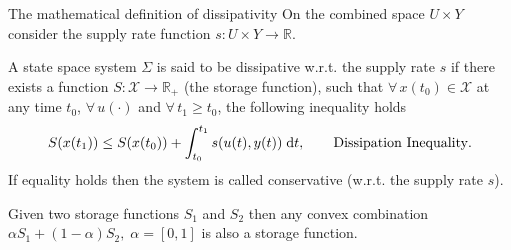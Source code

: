 \documentclass[aspectratio=169]{beamer}
\newcommand{\bbR}{\mathbb{R}}
\begin{document}
\begin{frame}{The mathematical definition of dissipativity}
On the combined space $U × Y$ consider the supply rate function $s : U \times Y \rightarrow \bbR$.

\begin{definition}
A state space system $\Sigma$ is said to be dissipative w.r.t. the supply rate $s$ if there exists a function $S : \mathcal{X} \rightarrow \bbR_+$ (the storage function), such
that $\forall \, x(t_0) \in \mathcal{X}$ at any time $t_0$, $\forall\,  u(\cdot)$ and $\forall\, t_1 \ge t_0$, the following inequality holds
\begin{equation}\label{eq:diss_ineq}
	S(x(t_1)) \le S(x(t_0)) + \int_{t_0}^{t_1} s(u(t), y(t)) \d t, \qquad \text{Dissipation Inequality}.
\end{equation}
If equality holds then the system is called conservative (w.r.t. the supply rate $s$). 
\end{definition}
\begin{corollary}
	Given two storage functions $S_1$ and $S_2$ then any convex combination $\alpha S_1 + (1-\alpha) S_2, \; \alpha=[0,1]$ is also a storage function.
\end{corollary}

\end{frame}
\end{document}
